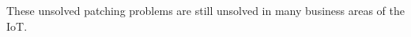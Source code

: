\documentclass[conference]{IEEEtran}
\begin{document}
These unsolved patching problems are still unsolved in many business areas of 
the IoT. 



%
%



%
%
\end{document}
